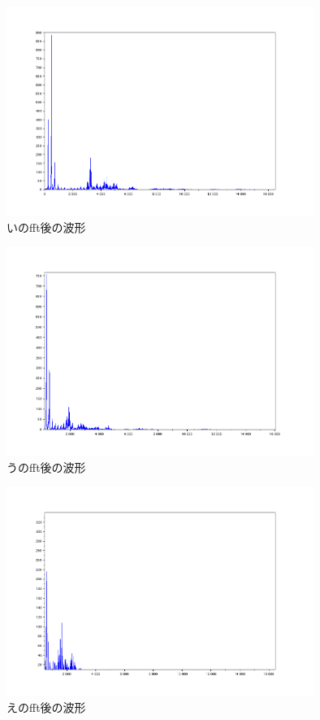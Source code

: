 \documentclass[12pt,oneside]{sotsuken_paper}
\begin{document}
\begin{figure}[htbp]
\begin{center}
\includegraphics[width=100mm]{img/i_fft.png}
\caption{いのfft後の波形}
\label{fig:i_fft}
\end{center}
\end{figure}


\begin{figure}[htbp]
\begin{center}
\includegraphics[width=100mm]{img/u_fft.png}
\caption{うのfft後の波形}
\label{fig:u_fft}
\end{center}
\end{figure}


\begin{figure}[htbp]
\begin{center}
\includegraphics[width=100mm]{img/e_fft.png}
\caption{えのfft後の波形}
\label{fig:e_fft}
\end{center}
\end{figure}
\end{document}
